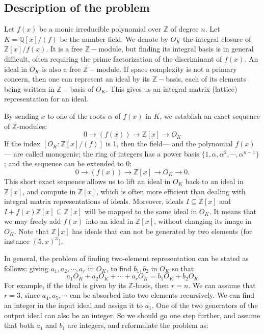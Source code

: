 \documentclass[runningheads, letter]{llncs}
\newcommand{\Z}{{\mathbb Z}}
\newcommand{\Q}{{\mathbb Q}}
\begin{document}
\subsection{Description of the problem}

Let \( f(x) \) be a monic irreducible polynomial over \( \Z \)
of degree \( n \). Let \( K= \Q[x]/(f) \) be the number field.
We denote by \( O_K \)  the integral closure
of \( \Z[x]/f(x) \). It is a free \( \Z-\)module, but finding
its integral basis is in general difficult, often
requiring the prime factorization of the discriminant of \( f(x) \). 
An ideal in \( O_K \) is also a free \( \Z-\)module.  
If space complexity is not a primary concern,
then one \cite{Cohen2012}  can represent an ideal by its \( \Z-\)basis,
each of its elements being written in \( \Z-\)basis of \( O_K \).
This gives us an integral matrix (lattice) representation for an
ideal.

By sending \( x \) to one of the roots \( \alpha \)
of \( f(x) \) in \( K \), we establish an exact sequence
of \( \Z \)-modules: 
\[ 0 \rightarrow (f(x)) \rightarrow  \Z[x] \rightarrow O_K  \]
If the index \( [ O_K:\Z[x]/(f) ] \) is 1, then the field---
and the polynomial \( f(x) \)---
are called monogenic; the ring of integers has a power basis
\( \{1, \alpha, \alpha^2, \cdots, \alpha^{n-1}\} \);
and the sequence can be extended to \( 0 \):
\[ 0 \rightarrow (f(x)) \rightarrow  \Z[x] \rightarrow
  O_K \rightarrow 0. \]
This short exact sequence allows us to lift an ideal in \( O_K \) 
back to  an ideal in \( \Z[x]  \), and  compute in \( \Z[x] \),
which is often more efficient than  dealing with integral
matrix representations of ideals.
Moreover, ideals  \( I \subseteq \Z[x] \) and
\( I + f(x)\Z[x] \subseteq \Z[x]\)  
will be mapped to the same ideal in \( O_K \).
It means that we may freely add \( f(x) \) into an
ideal in \( \Z[x] \), without changing its image in \( O_K \).
Note that \( \Z[x] \) has ideals that can not be generated by
two elements (for instance \( (5, x)^3 \)).

In general, the problem of finding two-element representation
can be stated as follows: giving
\( a_1, a_2, \cdots, a_r  \) in \( O_K \),
to find \( b_1, b_2 \) in \( O_K \) so that
\[ a_1 O_K + a_2 O_K + \cdots + a_r O_K = b_1 O_K + b_2 O_K  \]
For example, if the ideal is given by its \( \Z \)-basis,
then \( r=n \).
We can assume that \( r=3 \), since \( a_4, a_5, \cdots \) 
can be absorbed into two elements recursively.
We can find an integer in the input ideal and assign it to
\( a_1 \). One of the two generators of the output ideal
can also be an integer.
%
So we should go one step further, and assume that
both \( a_1 \) and \( b_1\) are integers, and reformulate
the problem as:
\end{document}
